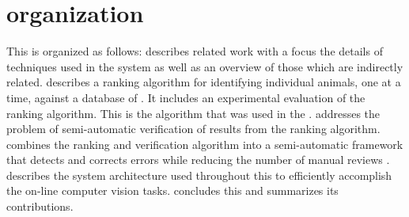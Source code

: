 \section{\Thesis{} organization} %
    This \thesis{} is organized as follows:
     describes related work with a focus the details of
      techniques used in the system as well as an overview of those which are
      indirectly related.
     describes a ranking algorithm for identifying
      individual animals, one \annot{} at a time, against a database of
      \exemplars{}.
    It includes an experimental evaluation of the ranking algorithm.
    This is the algorithm that was used in the \GZC{}.
     addresses the problem of semi-automatic verification
      of results from the ranking algorithm.
     combines the ranking and verification algorithm into a
      semi-automatic framework that detects and corrects errors while reducing
      the number of manual reviews .
     describes the system architecture used throughout this
    \thesis{} to efficiently accomplish the on-line computer vision tasks.
       concludes this \thesis{} and summarizes its contributions.
